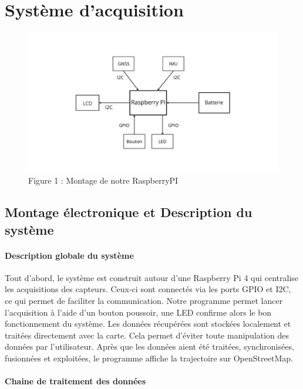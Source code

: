 \chapter{Système d’acquisition}

\begin{figure}[h]
    \centering
    \includegraphics[width=1\textwidth]{montage.png} %
    \caption{Figure 1 : Montage de notre RaspberryPI}
    \label{fig:montage}
\end{figure}

\section{Montage électronique et Description du système}

\vspace{1em}
\subsubsection*{Description globale du système}

Tout d'abord, le système est construit autour d’une Raspberry Pi 4 qui centralise les acquisitions des capteurs. Ceux-ci sont connectés via les ports GPIO et I2C, ce qui permet de faciliter la communication. Notre programme permet lancer l’acquisition à l'aide d'un bouton poussoir, une LED confirme alors le bon fonctionnement du système. Les données récupérées sont stockées localement et traitées directement avec la carte. Cela permet d'éviter toute manipulation des données par l'utilisateur. Après que les données aient été traitées, synchronisées, fusionnées et exploitées, le programme affiche la trajectoire sur OpenStreetMap.

\vspace{1em}
\subsubsection*{Chaine de traitement des données}

